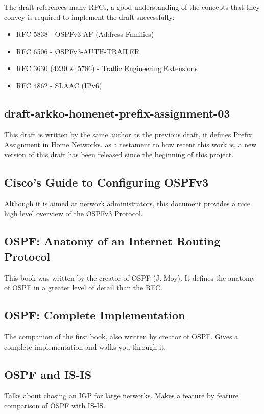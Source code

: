 \documentclass[12pt]{report}
\begin{document}
The draft references many RFCs, a good understanding of the concepts 
that they convey is required to implement the draft successfully:

\begin{itemize}
	\item RFC 5838 - OSPFv3-AF (Address Families)
	\item RFC 6506 - OSPFv3-AUTH-TRAILER
	\item RFC 3630 (4230 \& 5786) - Traffic Engineering Extensions 
	\item RFC 4862 - SLAAC (IPv6) 
\end{itemize}


\subsection{draft-arkko-homenet-prefix-assignment-03}
 		
This draft is written by the same author as the previous draft, it defines
Prefix Assignment in Home Networks. as a testament to how recent this work is, a
new version of this draft has been released since the beginning of this project. 



\subsection{Cisco's Guide to Configuring OSPFv3}

Although it is aimed at network administrators, this document provides a
nice high level overview of the OSPFv3 Protocol.



\subsection{OSPF: Anatomy of an Internet Routing Protocol}
 This book was written by the creator of OSPF (J. Moy). It defines the anatomy
 of OSPF in a greater level of detail than the RFC.

\subsection{OSPF: Complete Implementation}
The companion of the first book, also written by creator of OSPF. Gives a
complete implementation and walks you through it.

\subsection{OSPF and IS-IS}
Talks about chosing an IGP for large networks. Makes a feature by feature
comparison of OSPF with IS-IS.
\end{document}
